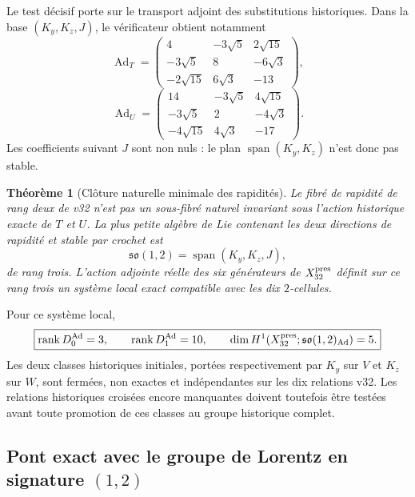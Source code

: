 \documentclass[11pt,a4paper]{article}
\newtheorem{theorem}{Théorème}[section]
\newcommand{\rank}{\operatorname{rank}}
\begin{document}
Le test décisif porte sur le transport adjoint des substitutions historiques. Dans la base
$(K_y,K_z,J)$, le vérificateur obtient notamment
\[
 \operatorname{Ad}_T=
 \begin{pmatrix}
 4&-3\sqrt5&2\sqrt{15}\\
 -3\sqrt5&8&-6\sqrt3\\
 -2\sqrt{15}&6\sqrt3&-13
 \end{pmatrix},
\]
\[
 \operatorname{Ad}_U=
 \begin{pmatrix}
 14&-3\sqrt5&4\sqrt{15}\\
 -3\sqrt5&2&-4\sqrt3\\
 -4\sqrt{15}&4\sqrt3&-17
 \end{pmatrix}.
\]
Les coefficients suivant $J$ sont non nuls : le plan
$\operatorname{span}(K_y,K_z)$ n'est donc pas stable.

\begin{theorem}[Clôture naturelle minimale des rapidités]\label{thm:v33-rank3-lie}
Le fibré de rapidité de rang deux de v32 n'est pas un sous-fibré naturel invariant sous l'action
historique exacte de $T$ et $U$. La plus petite algèbre de Lie contenant les deux directions de
rapidité et stable par crochet est
\[
 \boxed{\mathfrak{so}(1,2)=\operatorname{span}(K_y,K_z,J),}
\]
de rang trois. L'action adjointe réelle des six générateurs de $X_{32}^{\rm pres}$ définit sur ce
rang trois un système local exact compatible avec les dix $2$-cellules.
\end{theorem}

Pour ce système local,
\begin{equation}\label{eq:v33-ad-ranks}
 \boxed{
 \rank D_0^{\operatorname{Ad}}=3,
 \qquad
 \rank D_1^{\operatorname{Ad}}=10,
 \qquad
 \dim H^1(X_{32}^{\rm pres};\mathfrak{so}(1,2)_{\operatorname{Ad}})=5.}
\end{equation}
Les deux classes historiques initiales, portées respectivement par $K_y$ sur $V$ et $K_z$ sur $W$,
sont fermées, non exactes et indépendantes sur les dix relations v32. Les relations historiques
croisées encore manquantes doivent toutefois être testées avant toute promotion de ces classes au
groupe historique complet.

\subsection{Pont exact avec le groupe de Lorentz en signature \texorpdfstring{$(1,2)$}{(1,2)}}
\end{document}

